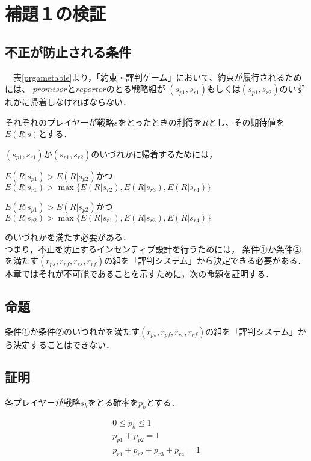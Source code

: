 \section{補題１の検証}
\subsection{不正が防止される条件}
　表\ref{prgametable}より，「約束・評判ゲーム」において、約束が履行されるためには、
  $promisor$と$reporter$のとる戦略組が
  $ (s_{p1}, s_{r1})$もしくは$(s_{p1}, s_{r2})$のいずれかに帰着しなければならない．

  それぞれのプレイヤーが戦略$s$をとったときの利得を$R$とし、その期待値を$E(R|s)$とする．

  $(s_{p1}, s_{r1})$か$(s_{p1}, s_{r2})$のいづれかに帰着するためには，

\begin{description}
  \centering
  \item[条件①] $E(R|s_{p1})>E(R|s_{p2})$かつ$E(R|s_{r1})>\max\{E(R|s_{r2}), E(R|s_{r3}), E(R|s_{r4}) \}$
  \item[条件②] $E(R|s_{p1})>E(R|s_{p2})$かつ$E(R|s_{r2})>\max\{E(R|s_{r1}), E(R|s_{r3}), E(R|s_{r4}) \}$
\end{description}

  のいづれかを満たす必要がある．\\

  つまり，不正を防止するインセンティブ設計を行うためには，
  条件①か条件②を満たす$(r_{ps}, r_{pf}, r_{rs}, r_{rf})$の組を「評判システム」から決定できる必要がある．
  本章ではそれが不可能であることを示すために，次の命題を証明する．

\subsection{命題}
条件①か条件②のいづれかを満たす$(r_{ps}, r_{pf}, r_{rs}, r_{rf})$の組を「評判システム」から決定することはできない．
  
\subsection{証明}
各プレイヤーが戦略$s_{k}$をとる確率を$p_{k}$とする．

\begin{gather}
  0 \leq p_{k} \leq 1 \\
  p_{p1} + p_{p2} = 1 \\
  p_{r1} + p_{r2} + p_{r3} + p_{r4} = 1
\end{gather}

